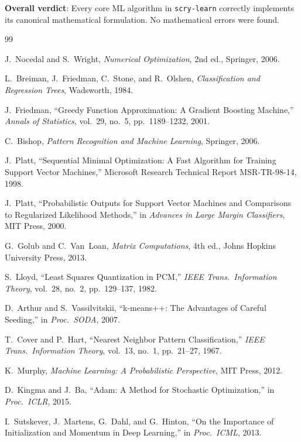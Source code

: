 \documentclass[11pt,a4paper]{article}
\theoremstyle{remark}
\begin{document}
\noindent\textbf{Overall verdict}: Every core ML algorithm in \texttt{scry-learn}
correctly implements its canonical mathematical formulation.  No mathematical
errors were found.

\begin{thebibliography}{99}

J.~Nocedal and S.~Wright,
\emph{Numerical Optimization}, 2nd ed.,
Springer, 2006.

L.~Breiman, J.~Friedman, C.~Stone, and R.~Olshen,
\emph{Classification and Regression Trees},
Wadsworth, 1984.

J.~Friedman,
``Greedy Function Approximation: A Gradient Boosting Machine,''
\emph{Annals of Statistics}, vol.~29, no.~5, pp.~1189--1232, 2001.

C.~Bishop,
\emph{Pattern Recognition and Machine Learning},
Springer, 2006.

J.~Platt,
``Sequential Minimal Optimization: A Fast Algorithm for Training Support
Vector Machines,''
Microsoft Research Technical Report MSR-TR-98-14, 1998.

J.~Platt,
``Probabilistic Outputs for Support Vector Machines and Comparisons to
Regularized Likelihood Methods,''
in \emph{Advances in Large Margin Classifiers}, MIT Press, 2000.

G.~Golub and C.~Van~Loan,
\emph{Matrix Computations}, 4th ed.,
Johns Hopkins University Press, 2013.

S.~Lloyd,
``Least Squares Quantization in PCM,''
\emph{IEEE Trans.\ Information Theory}, vol.~28, no.~2, pp.~129--137, 1982.

D.~Arthur and S.~Vassilvitskii,
``k-means++: The Advantages of Careful Seeding,''
in \emph{Proc.\ SODA}, 2007.

T.~Cover and P.~Hart,
``Nearest Neighbor Pattern Classification,''
\emph{IEEE Trans.\ Information Theory}, vol.~13, no.~1, pp.~21--27, 1967.

K.~Murphy,
\emph{Machine Learning: A Probabilistic Perspective},
MIT Press, 2012.

D.~Kingma and J.~Ba,
``Adam: A Method for Stochastic Optimization,''
in \emph{Proc.\ ICLR}, 2015.

I.~Sutskever, J.~Martens, G.~Dahl, and G.~Hinton,
``On the Importance of Initialization and Momentum in Deep Learning,''
in \emph{Proc.\ ICML}, 2013.

\end{thebibliography}
\end{document}

